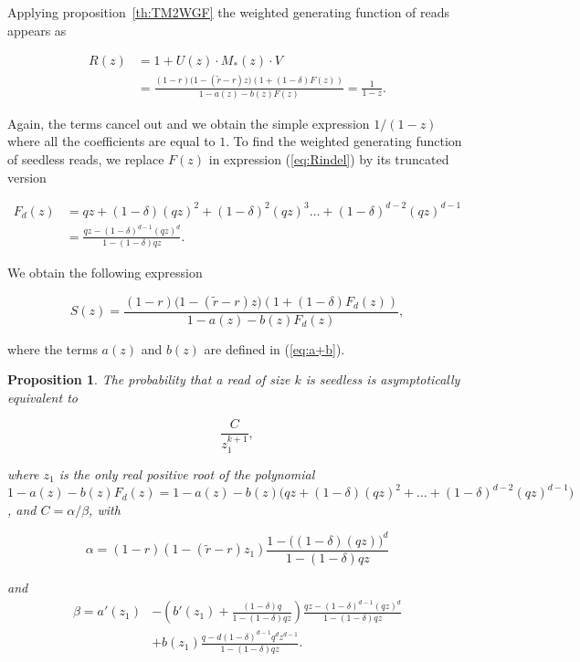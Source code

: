 \documentclass{article}
\newtheorem{proposition}{Proposition}
\begin{document}
Applying proposition~\ref{th:TM2WGF} the weighted generating function of
reads appears as

\begin{equation}
\label{eq:Rindel}
\begin{split}
R(z) &= 1 + U(z) \cdot M_*(z) \cdot V \\
&= \frac{(1-r)\big( 1-(\tilde{r}-r)z \big)
\left(1+(1-\delta)F(z) \right)}{1-a(z)-b(z)F(z)}
= \frac{1}{1-z}.
\end{split}
\end{equation}

Again, the terms cancel out and we obtain the simple expression
$1/(1-z)$ where all the coefficients are equal to $1$. To find the
weighted generating function of seedless reads, we replace $F(z)$ in
expression (\ref{eq:Rindel}) by its truncated version

\begin{equation*}
\begin{split}
F_d(z) &= qz + (1-\delta)(qz)^2 + (1-\delta)^2(qz)^3 \ldots +
(1-\delta)^{d-2}(qz)^{d-1} \\
&= \frac{qz-(1-\delta)^{d-1}(qz)^d}{1-(1-\delta)qz}.
\end{split}
\end{equation*}

We obtain the following expression

\begin{equation}
\label{eq:Sindel}
S(z) = \frac{(1-r)\big( 1-(\tilde{r}-r)z \big) \left(1+(1-\delta)F_d(z)
\right)}{1-a(z)-b(z)F_d(z)},
\end{equation}

\noindent
where the terms $a(z)$ and $b(z)$ are defined in (\ref{eq:a+b}).

\begin{proposition}
\label{th:pins}
The probability that a read of size $k$ is seedless is asymptotically
equivalent to

\begin{equation*}
\frac{C}{z_1^{k+1}},
\end{equation*}

\noindent
where $z_1$ is the only real positive root of the polynomial
$1-a(z)-b(z)F_d(z) = 1-a(z)-b(z)\big(qz+(1-\delta)(qz)^2 + \ldots +
(1-\delta)^{d-2}(qz)^{d-1}\big)$, and $C = \alpha / \beta$, with

\begin{equation*}
\alpha = (1-r)(1-(\tilde{r}-r)z_1)
   \frac{1-\big((1-\delta)(qz)\big)^d}{1-(1-\delta)qz}
\end{equation*}

\noindent
and
\begin{equation*}
\begin{split}
\beta = a'(z_1) &- \left( b'(z_1) +
\frac{(1-\delta)q}{1-(1-\delta)qz}\right)
\frac{qz-(1-\delta)^{d-1}(qz)^d}{1-(1-\delta)qz} \\
&+b(z_1) \frac{q-d(1-\delta)^{d-1}q^dz^{d-1}}{1-(1-\delta)qz}.
\end{split}
\end{equation*}
\end{proposition}
\end{document}
